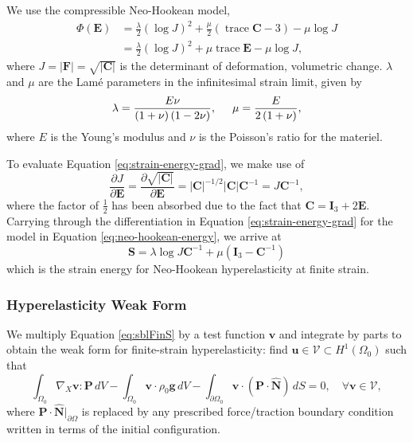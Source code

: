 We use the compressible Neo-Hookean model,
\begin{equation}
   \begin{aligned}
   \Phi \left( \mathbf E \right) &= \frac{\lambda}{2} \left( \log J \right)^2 + \frac \mu 2 \left(\operatorname{trace} \mathbf C - 3 \right) - \mu \log J \\
     &= \frac{\lambda}{2}\left( \log J \right)^2 + \mu \operatorname{trace} \mathbf E - \mu \log J,
   \end{aligned}
   \label{eq:neo-hookean-energy}
\end{equation}
where $J = \lvert \mathbf F \rvert = \sqrt{\lvert \mathbf C \rvert}$ is the determinant of deformation, volumetric change.
$\lambda$ and $\mu$ are the Lamé parameters in the infinitesimal strain limit, given by
\begin{equation}
\lambda = \frac{E \nu}{\left( 1 + \nu \right) \left( 1 - 2 \nu \right)}, \hspace{5mm}
\mu = \frac{E}{2 \left( 1 + \nu \right)},
\end{equation}
where $E$ is the Young's modulus and $\nu$ is the Poisson's ratio for the materiel.

To evaluate Equation \ref{eq:strain-energy-grad}, we make use of
\begin{equation}
   \frac{\partial J}{\partial \mathbf E} = \frac{\partial \sqrt{\lvert \mathbf C \rvert}}{\partial \mathbf E} = \lvert \mathbf C \rvert^{-1/2} \lvert \mathbf C \rvert \mathbf C^{-1} = J \mathbf C^{-1},
\end{equation}
where the factor of $\frac 1 2$ has been absorbed due to the fact that $\mathbf C = \mathbf I_3 + 2 \mathbf E$.
Carrying through the differentiation in Equation \ref{eq:strain-energy-grad} for the model in Equation \ref{eq:neo-hookean-energy}, we arrive at
\begin{equation}
   \mathbf S = \lambda \log J \mathbf C^{-1} + \mu (\mathbf I_3 - \mathbf C^{-1})
   \label{eq:neo-hookean-stress}
\end{equation}
which is the strain energy for Neo-Hookean hyperelasticity at finite strain.

\subsubsection{Hyperelasticity Weak Form}

We multiply Equation \ref{eq:sblFinS} by a test function $\mathbf v$ and integrate by parts to obtain the weak form for finite-strain hyperelasticity:
find $\mathbf u \in \mathcal V \subset H^1 \left( \Omega_0 \right)$ such that
\begin{equation}
    \int_{\Omega_0}{\nabla_X \mathbf{v} \!:\! \mathbf{P}} \, dV
    - \int_{\Omega_0}{\mathbf{v} \cdot \rho_0 \mathbf{g}} \, dV
    - \int_{\partial \Omega_0}{\mathbf{v} \cdot (\mathbf{P} \cdot \hat{\mathbf{N}})} \, dS
    = 0, \quad \forall \mathbf v \in \mathcal V,
   \label{eq:hyperelastic-weak-form-initial}
\end{equation}    
where $\mathbf{P} \cdot \hat{\mathbf{N}}|_{\partial\Omega}$ is replaced by any prescribed force/traction boundary condition written in terms of the initial configuration.

